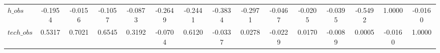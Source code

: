 \begin{center}
\begin{longtable}{lcccccccccccccc}
$h\_obs         $	 & 	          -0.1954	 & 	          -0.0156	 & 	          -0.1057	 & 	          -0.0873	 & 	          -0.2649	 & 	          -0.2441	 & 	          -0.3834	 & 	          -0.2971	 & 	          -0.0467	 & 	          -0.0205	 & 	          -0.0395	 & 	          -0.5492	 & 	           1.0000	 & 	          -0.0160 \\ 
$tech\_obs      $	 & 	           0.5317	 & 	           0.7021	 & 	           0.6545	 & 	           0.3192	 & 	          -0.0704	 & 	           0.6120	 & 	          -0.0337	 & 	           0.0278	 & 	          -0.0229	 & 	           0.0170	 & 	          -0.0089	 & 	           0.0005	 & 	          -0.0160	 & 	           1.0000 \\ 
\end{longtable}
 \end{center}
